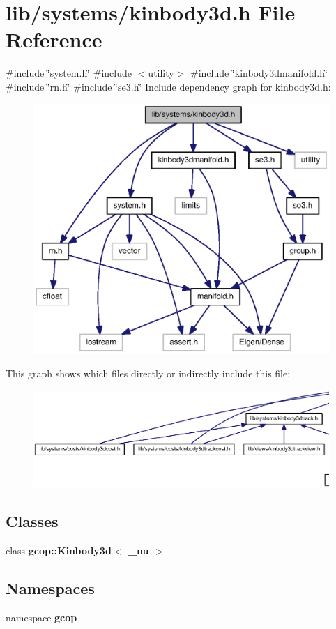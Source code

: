\section{lib/systems/kinbody3d.h \-File \-Reference}
\label{kinbody3d_8h}
{\ttfamily \#include \char`\"{}system.\-h\char`\"{}}\*
{\ttfamily \#include $<$utility$>$}\*
{\ttfamily \#include \char`\"{}kinbody3dmanifold.\-h\char`\"{}}\*
{\ttfamily \#include \char`\"{}rn.\-h\char`\"{}}\*
{\ttfamily \#include \char`\"{}se3.\-h\char`\"{}}\*
\-Include dependency graph for kinbody3d.\-h\-:
\nopagebreak
\begin{figure}[H]
\begin{center}
\leavevmode
\includegraphics[width=350pt]{kinbody3d_8h__incl}
\end{center}
\end{figure}
\-This graph shows which files directly or indirectly include this file\-:
\nopagebreak
\begin{figure}[H]
\begin{center}
\leavevmode
\includegraphics[width=350pt]{kinbody3d_8h__dep__incl}
\end{center}
\end{figure}
\subsection*{\-Classes}
\begin{DoxyCompactItemize}
\item 
class {\bf gcop\-::\-Kinbody3d$<$ \-\_\-nu $>$}
\end{DoxyCompactItemize}
\subsection*{\-Namespaces}
\begin{DoxyCompactItemize}
\item 
namespace {\bf gcop}
\end{DoxyCompactItemize}
